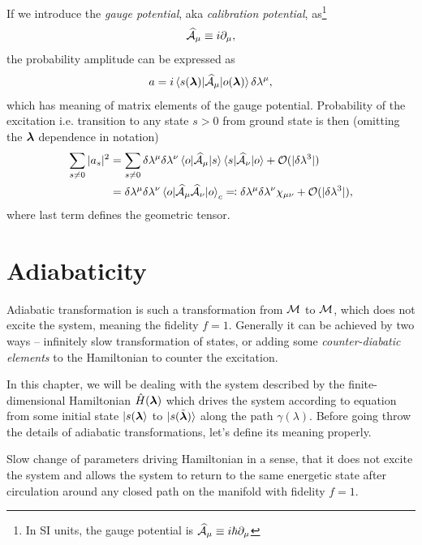 If we introduce the \emph{gauge potential}, aka \emph{calibration potential}, as\footnote{In SI units, the gauge potential is $\AA_\mu\equiv i\hbar\partial_{\mu}$}
\begin{equation}
    \AA_\mu\equiv i\partial_{\mu},
\end{equation}
the probability amplitude can be expressed as
\begin{equation}
   a=i\braket{s(\llambda)|\AA_\mu |o(\llambda)}\delta\lambda^\mu,
   \label{eq:probabilityOfTransitionIsGauge}
\end{equation}
which has meaning of matrix elements of the gauge potential. Probability of the excitation i.e. transition to any state $s>0$ from ground state is then (omitting the $\llambda$ dependence in notation)
\begin{equation}
    \begin{split}
        \sum_{s\neq 0}|a_s|^2&=  \sum_{s\neq 0} \delta \lambda^\mu \delta \lambda^\nu\braket{o|\AA_\mu|s}\braket{s|\AA_\nu|o}+\O(|\delta \lambda^3|) \\
        &= \delta \lambda^\mu \delta \lambda^\nu\braket{o|\AA_\mu \AA_\nu|o}_c\eqqcolon \delta \lambda^\mu \delta \lambda^\nu\chi_{\mu\nu}+\O(|\delta \lambda^3|),
    \end{split}
\end{equation}
where last term defines the geometric tensor.



\section{Adiabaticity}
Adiabatic transformation is such a transformation from $\M$ to $\M$, which does not excite the system, meaning the fidelity $f=1$. Generally it can be achieved by two ways -- infinitely slow transformation of states, or adding some \emph{counter-diabatic elements} to the Hamiltonian to counter the excitation.


In this chapter, we will be dealing with the system described by the finite-dimensional Hamiltonian $\HH(\llambda)$ which drives the system according to \Schrodinger equation from some initial state $\ket{s(\llambda}$ to $\ket{s(\tilde\llambda)}$ along the path $\gamma(\lambda)$. Before going throw the details of adiabatic transformations, let's define its meaning properly.

\begin{definition}[Adibaticity]
    Slow change of parameters driving Hamiltonian in a sense, that it does not excite the system and allows the system to return to the same energetic state after circulation around any closed path on the manifold with fidelity $f=1$.
\end{definition}


